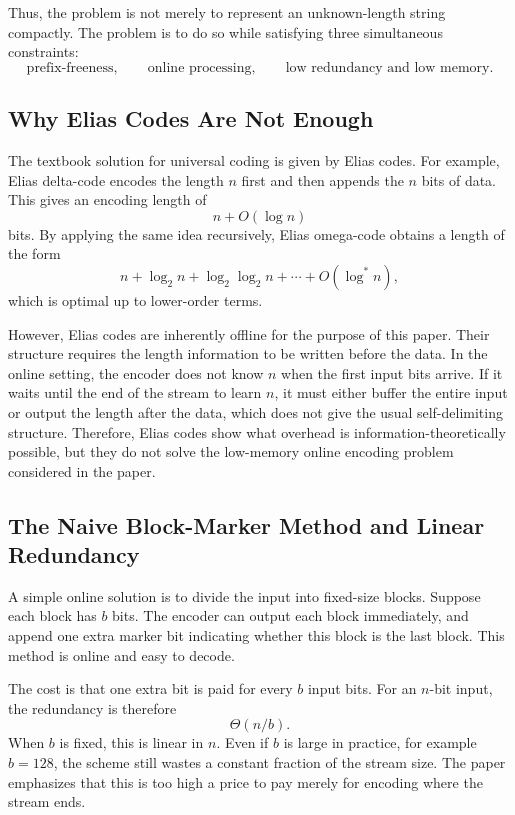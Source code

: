 Thus, the problem is not merely to represent an unknown-length string compactly. The problem is to do so while satisfying three simultaneous constraints:
\[
    \text{prefix-freeness}, \qquad
    \text{online processing}, \qquad
    \text{low redundancy and low memory}.
\]

\subsection{Why Elias Codes Are Not Enough}

The textbook solution for universal coding is given by Elias codes. For example, Elias delta-code encodes the length \(n\) first and then appends the \(n\) bits of data. This gives an encoding length of
\[
    n + O(\log n)
\]
bits. By applying the same idea recursively, Elias omega-code obtains a length of the form
\[
    n + \log_2 n + \log_2 \log_2 n + \cdots + O(\log^* n),
\]
which is optimal up to lower-order terms.

However, Elias codes are inherently offline for the purpose of this paper. Their structure requires the length information to be written before the data. In the online setting, the encoder does not know \(n\) when the first input bits arrive. If it waits until the end of the stream to learn \(n\), it must either buffer the entire input or output the length after the data, which does not give the usual self-delimiting structure. Therefore, Elias codes show what overhead is information-theoretically possible, but they do not solve the low-memory online encoding problem considered in the paper.

\subsection{The Naive Block-Marker Method and Linear Redundancy}

A simple online solution is to divide the input into fixed-size blocks. Suppose each block has \(b\) bits. The encoder can output each block immediately, and append one extra marker bit indicating whether this block is the last block. This method is online and easy to decode.

The cost is that one extra bit is paid for every \(b\) input bits. For an \(n\)-bit input, the redundancy is therefore
\[
    \Theta(n/b).
\]
When \(b\) is fixed, this is linear in \(n\). Even if \(b\) is large in practice, for example \(b = 128\), the scheme still wastes a constant fraction of the stream size. The paper emphasizes that this is too high a price to pay merely for encoding where the stream ends.

